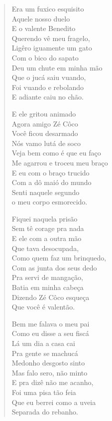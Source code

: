\begin{verse}
Era um fuxico esquisito\\
Aquele nosso duelo\\
E o valente Benedito\\
Querendo vê meu fragelo,\\
Ligêro iguamente um gato\\
Com o bico do sapato\\
Deu um chute em minha mão\\
Que o jucá saiu vuando,\\
Foi vuando e rebolando\\
E adiante caiu no chão.

E ele gritou animado\\
Agora amigo Zé Côco\\
Você ficou desarmado\\
Nós vamo lutá de soco\\
Veja bem como é que eu faço\\
Me agarrou e troceu meu braço\\
E eu com o braço trucido\\
Com a dô maió do mundo\\
Senti naquele segundo\\
o meu corpo esmorecido.

Fiquei naquela prisão\\
Sem tê corage pra nada\\
E ele com a outra mão\\
Que tava desocupada,\\
Como quem faz um brinquedo,\\
Com as junta dos seus dedo\\
Pra servi de mangação,\\
Batia em minha cabeça\\
Dizendo Zé Côco esqueça\\
Que você é valentão.

Bem me falava o meu pai\\
Como eu disse a seu fiscá\\
Lá um dia a casa cai\\
Pra gente se machucá\\
Medonho desgosto sinto\\
Mas falo sero, não minto\\
E pra dizê não me acanho,\\
Foi uma pisa tão feia\\
Que eu berrei como a uveia\\
Separada do rebanho.


\end{verse}
